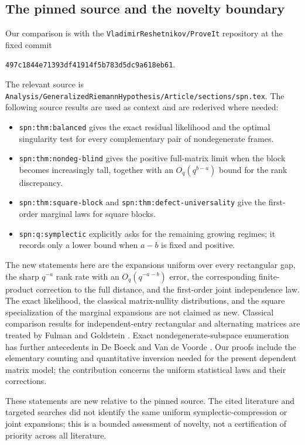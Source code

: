 \documentclass[11pt]{article}
\theoremstyle{definition}
\theoremstyle{remark}
\begin{document}
\subsection{The pinned source and the novelty boundary}

Our comparison is with the \texttt{VladimirReshetnikov/ProveIt} repository at the fixed commit
\begin{center}\small
\texttt{497c1844e71393df41914f5b783d5dc9a618eb61}.
\end{center}
The relevant source is
\nolinkurl{Analysis/GeneralizedRiemannHypothesis/Article/sections/spn.tex}.
The following source results are used as context and are rederived where needed:

\begin{itemize}[leftmargin=1.6em]
\item \texttt{spn:thm:balanced} gives the exact residual likelihood and the optimal singularity test for every complementary pair of nondegenerate frames.
\item \texttt{spn:thm:nondeg-blind} gives the positive full-matrix limit when the block becomes increasingly tall, together with an $O_q(q^{b-a})$ bound for the rank discrepancy.
\item \texttt{spn:thm:square-block} and \texttt{spn:thm:defect-universality} give the first-order marginal laws for square blocks.
\item \texttt{spn:q:symplectic} explicitly asks for the remaining growing regimes; it records only a lower bound when $a-b$ is fixed and positive.
\end{itemize}

The new statements here are the expansions uniform over every rectangular gap, the sharp $q^{-a}$ rank rate with an $O_q(q^{-a-b})$ error, the corresponding finite-product correction to the full distance, and the first-order joint independence law. The exact likelihood, the classical matrix-nullity distributions, and the square specialization of the marginal expansions are not claimed as new. Classical comparison results for independent-entry rectangular and alternating matrices are treated by Fulman and Goldstein \cite{FulmanGoldstein}. Exact nondegenerate-subspace enumeration has further antecedents in De Boeck and Van de Voorde \cite{DeBoeckVanDeVoorde}. Our proofs include the elementary counting and quantitative inversion needed for the present dependent matrix model; the contribution concerns the uniform statistical laws and their corrections.

These statements are new relative to the pinned source. The cited literature and targeted searches did not identify the same uniform symplectic-compression or joint expansions; this is a bounded assessment of novelty, not a certification of priority across all literature.
\end{document}
